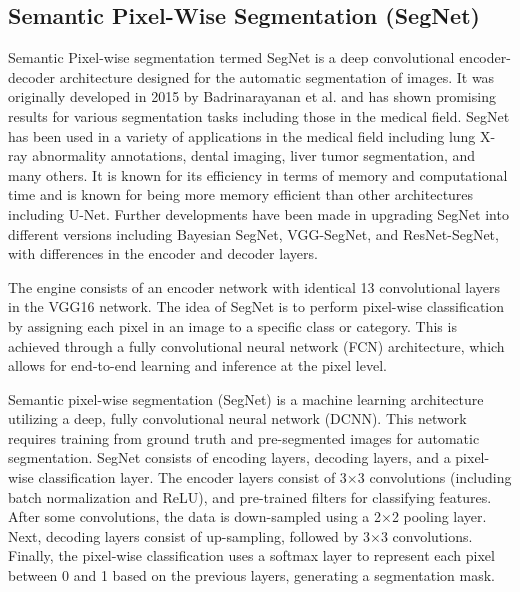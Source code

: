 \subsection{Semantic Pixel-Wise Segmentation (SegNet)}
Semantic Pixel-wise segmentation termed SegNet is a deep convolutional encoder-decoder architecture designed for the automatic segmentation of images. It was originally developed in 2015 by Badrinarayanan et al.\cite{} and has shown promising results for various segmentation tasks including those in the medical field. SegNet has been used in a variety of applications in the medical field including lung X-ray abnormality annotations\cite{}, dental imaging\cite{Automatic mandibular canal detection using a deep convolutional neural network}, liver tumor segmentation\cite{Classification of Liver Tumors from Computed Tomography Using NRSVM}, and many others. It is known for its efficiency in terms of memory and computational time and is known for being more memory efficient than other architectures including U-Net\cite{Workflow for Off-Site Bridge Inspection Using Automatic Damage Detection-Case Study of the Pahtajokk Bridge}. Further developments have been made in upgrading SegNet into different versions including Bayesian SegNet\cite{An Efficient Retinal Segmentation-Based Deep Learning Framework for Disease Prediction}, VGG-SegNet\cite{}, and ResNet-SegNet\cite{}, with differences in the encoder and decoder layers.

The engine consists of an encoder network with identical 13 convolutional layers in the VGG16 network. The idea of SegNet is to perform pixel-wise classification by assigning each pixel in an image to a specific class or category. This is achieved through a fully convolutional neural network (FCN) architecture, which allows for end-to-end learning and inference at the pixel level. 

Semantic pixel-wise segmentation (SegNet) is a machine learning architecture utilizing a deep, fully convolutional neural network (DCNN). This network requires training from ground truth and pre-segmented images for automatic segmentation. SegNet consists of encoding layers, decoding layers, and a pixel-wise classification layer. The encoder layers consist of 3$\times$3 convolutions (including batch normalization and ReLU), and pre-trained filters for classifying features. After some convolutions, the data is down-sampled using a 2$\times$2 pooling layer. Next, decoding layers consist of up-sampling, followed by 3$\times$3 convolutions. Finally, the pixel-wise classification uses a softmax layer to represent each pixel between 0 and 1 based on the previous layers, generating a segmentation mask.

